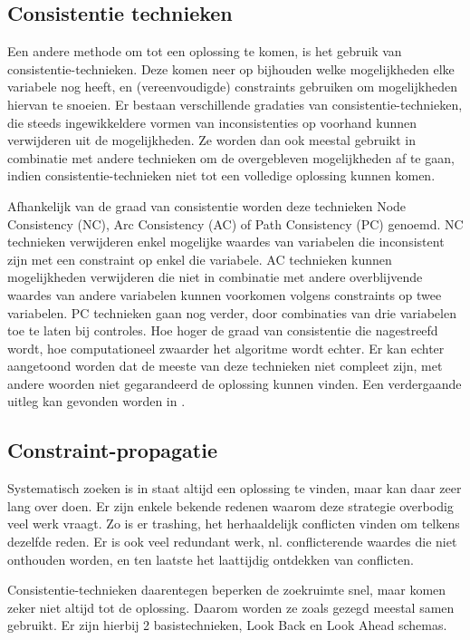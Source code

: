 \subsection{Consistentie technieken}

Een andere methode om tot een oplossing te komen, is het gebruik van consistentie-technieken. Deze komen neer op bijhouden welke mogelijkheden elke variabele nog heeft, en (vereenvoudigde) constraints gebruiken om mogelijkheden hiervan te snoeien. Er bestaan verschillende gradaties van consistentie-technieken, die steeds ingewikkeldere vormen van inconsistenties op voorhand kunnen verwijderen uit de mogelijkheden. Ze worden dan ook meestal gebruikt in combinatie met andere technieken om de overgebleven mogelijkheden af te gaan, indien consistentie-technieken niet tot een volledige oplossing kunnen komen.

Afhankelijk van de graad van consistentie worden deze technieken Node Consistency (NC), Arc Consistency (AC) of Path Consistency (PC) genoemd. NC technieken verwijderen enkel mogelijke waardes van variabelen die inconsistent zijn met een constraint op enkel die variabele. AC technieken kunnen mogelijkheden verwijderen die niet in combinatie met andere overblijvende waardes van andere variabelen kunnen voorkomen volgens constraints op twee variabelen. PC technieken gaan nog verder, door combinaties van drie variabelen toe te laten bij controles. Hoe hoger de graad van consistentie die nagestreefd wordt, hoe computationeel zwaarder het algoritme wordt echter. Er kan echter aangetoond worden dat de meeste van deze technieken niet compleet zijn, met andere woorden niet gegarandeerd de oplossing kunnen vinden. Een verdergaande uitleg kan gevonden worden in \cite{bartak01}. 

\subsection{Constraint-propagatie}

Systematisch zoeken is in staat altijd een oplossing te vinden, maar kan daar zeer lang over doen. Er zijn enkele bekende redenen waarom deze strategie overbodig veel werk vraagt. Zo is er trashing, het herhaaldelijk conflicten vinden om telkens dezelfde reden. Er is ook veel redundant werk, nl. conflicterende waardes die niet onthouden worden, en ten laatste het laattijdig ontdekken van conflicten.

Consistentie-technieken daarentegen beperken de zoekruimte snel, maar komen zeker niet altijd tot de oplossing. Daarom worden ze zoals gezegd meestal samen gebruikt. Er zijn hierbij 2 basistechnieken, Look Back en Look Ahead schemas.


